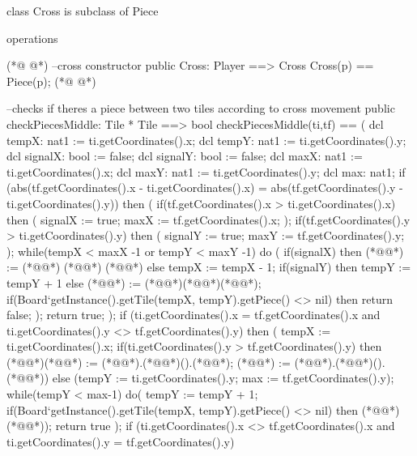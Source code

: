 \begin{vdmpp}[breaklines=true]
class Cross is subclass of Piece

operations

(*@
\label{Cross:5}
@*)
  --cross constructor
  public Cross: Player ==> Cross
  Cross(p) == Piece(p);
(*@
\label{checkPiecesMiddle:8}
@*)

  --checks if theres a piece between two tiles according to cross movement
  public checkPiecesMiddle: Tile * Tile ==> bool
  checkPiecesMiddle(ti,tf) == (
    dcl tempX: nat1 := ti.getCoordinates().x;
    dcl tempY: nat1 := ti.getCoordinates().y;
    dcl signalX: bool := false;
    dcl signalY: bool := false;
    dcl maxX: nat1 := ti.getCoordinates().x;
    dcl maxY: nat1 := ti.getCoordinates().y;
    dcl max: nat1;
    if (abs(tf.getCoordinates().x - ti.getCoordinates().x) = abs(tf.getCoordinates().y - ti.getCoordinates().y)) then (
     if(tf.getCoordinates().x > ti.getCoordinates().x)
      then (
       signalX := true;
       maxX := tf.getCoordinates().x;
      );
     if(tf.getCoordinates().y > ti.getCoordinates().y)
      then (
       signalY := true;
       maxY := tf.getCoordinates().y;
      );
     while(tempX < maxX -1 or tempY < maxY -1)
       do (
         if(signalX)
          then (*@@*) := (*@@*) (*@\vdmnotcovered{+}@*) (*@@*)
         else tempX := tempX - 1;
         if(signalY)
          then tempY := tempY + 1
         else
          (*@@*) := (*@@*)(*@\vdmnotcovered{-}@*)(*@@*);
         if(Board`getInstance().getTile(tempX, tempY).getPiece() <> nil)
          then return false;
         );
     return true;
    );
    if (ti.getCoordinates().x = tf.getCoordinates().x and ti.getCoordinates().y <> tf.getCoordinates().y)
     then (
        tempX := ti.getCoordinates().x;
        if(ti.getCoordinates().y > tf.getCoordinates().y)
         then (*@\vdmnotcovered{(}@*)(*@@*) := (*@@*).(*@@*)().(*@@*); (*@@*) := (*@@*).(*@@*)().(*@@*))
         else (tempY := ti.getCoordinates().y; max := tf.getCoordinates().y);
        while(tempY < max-1)
         do(
           tempY := tempY + 1;
           if(Board`getInstance().getTile(tempX, tempY).getPiece() <> nil)
            then (*@@*) (*@@*));
        return true
        );
    if (ti.getCoordinates().x <> tf.getCoordinates().x and ti.getCoordinates().y = tf.getCoordinates().y) 

\end{vdmpp}
